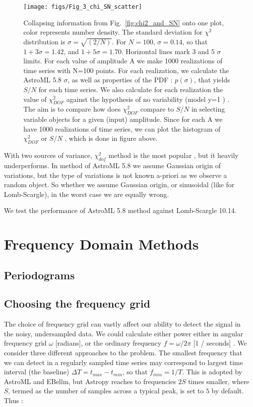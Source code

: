 \documentclass[fleqn,usenatbib]{mnras}  %
\begin{document}
\begin{figure}
  \texttt{[image: figs/Fig\_3\_chi\_SN\_scatter]}
  \caption{Collapsing information from Fig.~\ref{fig:chi2_and_SN} onto one plot, color represents number density. The standard deviation for $\chi^{2}$ distribution is $\sigma = \sqrt{(2/N)}$. For $N=100$, $\sigma = 0.14$, so that $1+3 \sigma = 1.42$, and $1+5\sigma=1.70$.  Horizontal lines mark 3 and 5 $\sigma$ limits. For each value of amplitude A we make 1000 realizations of time series with N=100 points.  For each realization, we calculate the AstroML 5.8 $\sigma$, as well as properties of the PDF : $p(\sigma)$, that yields $S/N$ for each time series.  We also calculate for each realization the value of $\chi^{2}_{DOF}$ against the hypothesis of no variability (model y=1 ) . The aim is to compare how does $\chi^{2}_{DOF}$ compare to $S/N$ in selecting variable objects for a given (input) amplitude. Since for each A we have 1000 realizations of time series, we can plot the histogram of $\chi^{2}_{DOF}$ or $S/N$ , which is done in figure above. }
  \label{fig:chi_sn_scatter}
\end{figure}



With two sources of variance, $\chi^{2}_{dof} $ method is the  most popular , but it heavily underperforms. In method of AstroML 5.8 we assume Gaussian origin of variations, but the type of variations is not known a-priori as we observe a random object. So whether we assume Gaussian origin, or sinusoidal (like for Lomb-Scargle), in the worst case we are equally wrong. 

We test the performance of AstroML 5.8 method against Lomb-Scargle 10.14. 

\section{Frequency Domain Methods}

\subsection{Periodograms}


\subsection{Choosing the frequency grid}
The choice of frequency grid can vastly affect our ability to detect the signal in the noisy, undersampled data. 
We could calculate either power either in angular frequency grid $\omega$ [radians], or the ordinary frequency $f = \omega / 2  \pi$ [1 / seconds] . 
We consider three different approaches to the problem.  
The smallest frequency that we can detect in a regularly sampled time series may correspond to largest time interval (the baseline) $\Delta T = t_{max} - t_{min}$, so that $f_{min} = 1 / T$. This is adopted by AstroML and EBellm, but Astropy reaches to frequencies $2 S$ times smaller, where $S$, termed as the number of samples across a typical peak, is set to $5$ by default. Thus :
\end{document}
